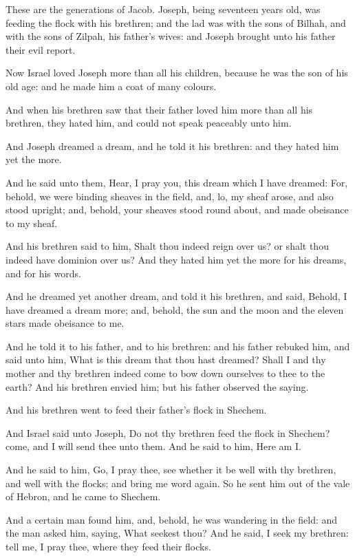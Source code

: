 \verse These are the generations of Jacob. Joseph, being seventeen years old, was feeding the flock with his brethren; and the lad was with the sons of Bilhah, and with the sons of Zilpah, his father's wives: and Joseph brought unto his father their evil report.

\verse Now Israel loved Joseph more than all his children, because he was the son of his old age: and he made him a coat of many colours.

\verse And when his brethren saw that their father loved him more than all his brethren, they hated him, and could not speak peaceably unto him.

\verse And Joseph dreamed a dream, and he told it his brethren: and they hated him yet the more.

\verse And he said unto them, Hear, I pray you, this dream which I have dreamed: \verse For, behold, we were binding sheaves in the field, and, lo, my sheaf arose, and also stood upright; and, behold, your sheaves stood round about, and made obeisance to my sheaf.

\verse And his brethren said to him, Shalt thou indeed reign over us? or shalt thou indeed have dominion over us? And they hated him yet the more for his dreams, and for his words.

\verse And he dreamed yet another dream, and told it his brethren, and said, Behold, I have dreamed a dream more; and, behold, the sun and the moon and the eleven stars made obeisance to me.

\verse And he told it to his father, and to his brethren: and his father rebuked him, and said unto him, What is this dream that thou hast dreamed?  Shall I and thy mother and thy brethren indeed come to bow down ourselves to thee to the earth?  \verse And his brethren envied him; but his father observed the saying.

\verse And his brethren went to feed their father's flock in Shechem.

\verse And Israel said unto Joseph, Do not thy brethren feed the flock in Shechem? come, and I will send thee unto them. And he said to him, Here am I.

\verse And he said to him, Go, I pray thee, see whether it be well with thy brethren, and well with the flocks; and bring me word again. So he sent him out of the vale of Hebron, and he came to Shechem.

\verse And a certain man found him, and, behold, he was wandering in the field: and the man asked him, saying, What seekest thou?  \verse And he said, I seek my brethren: tell me, I pray thee, where they feed their flocks.

